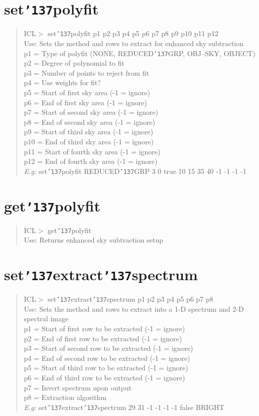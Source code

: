 \documentclass[a4paper]{book}
\renewcommand{\_}{{\tt\char'137}}
\begin{document}
\section{set\_polyfit}
\begin{quote}
ICL$>$ set\_polyfit p1 p2 p3 p4 p5 p6 p7 p8 p9 p10 p11 p12 \\
Use: Sets the method and rows to extract for enhanced sky subtraction \\
p1 = Type of polyfit (NONE, REDUCED\_GRP, OBJ--SKY, OBJECT) \\
p2 = Degree of polynomial to fit \\
p3 = Number of points to reject from fit \\
p4 = Use weights for fit? \\ 
p5 = Start of first sky area (-1 = ignore) \\
p6 = End of first sky area (-1 = ignore) \\
p7 = Start of second sky area (-1 = ignore) \\
p8 = End of second sky area (-1 = ignore) \\
p9 = Start of third sky area (-1 = ignore) \\
p10 = End of third sky area (-1 = ignore) \\
p11 = Start of fourth sky area (-1 = ignore) \\
p12 = End of fourth sky area (-1 = ignore) \\
{\em E.g:} set\_polyfit REDUCED\_GRP 3 0 {\sc true} 10 15 35 40 -1 -1 -1 -1
\end{quote}
\section{get\_polyfit}
\begin{quote}
ICL$>$ get\_polyfit \\
Use: Returns enhanced sky subtraction setup
\end{quote}

\section{set\_extract\_spectrum}
\begin{quote}
ICL$>$ set\_extract\_spectrum p1 p2 p3 p4 p5 p6 p7 p8 \\
Use: Sets the method and rows to extract into a 1-D spectrum and 2-D spectral image \\
p1 = Start of first row to be extracted (-1 = ignore) \\
p2 = End of first row to be extracted (-1 = ignore) \\
p3 = Start of second row to be extracted (-1 = ignore) \\
p4 = End of second row to be extracted (-1 = ignore) \\
p5 = Start of third row to be extracted (-1 = ignore) \\
p6 = End of third row to be extracted (-1 = ignore) \\
p7 = Invert spectrum upon output \\
p8 = Extraction algorithm \\
{\em E.g:} set\_extract\_spectrum 29 31 -1 -1 -1 -1 {\sc false} BRIGHT
\end{quote}
\end{document}
